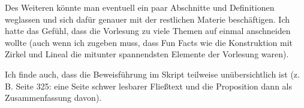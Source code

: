 \documentclass[a4paper,11pt]{article}
\begin{document}
\begin{itemize}
 Des Weiteren k\"onnte man eventuell ein paar Abschnitte und Definitionen weglassen und sich daf\"ur genauer mit der restlichen Materie besch\"aftigen. Ich hatte das Gef\"uhl, dass die Vorlesung zu viele Themen auf einmal anschneiden wollte (auch wenn ich zugeben muss, dass Fun Facts wie die Konstruktion mit Zirkel und Lineal die mitunter spannendsten Elemente der Vorlesung waren).

 Ich finde auch, dass die Beweisf\"uhrung im Skript teilweise un\"ubersichtlich ist (z. B. Seite 325: eine Seite schwer lesbarer Flie\ss{}text und die Proposition dann als Zusammenfassung davon).
\end{itemize}
\end{document}
